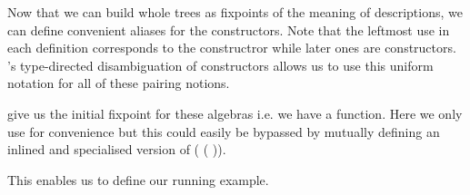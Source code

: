 Now that we can build whole trees as fixpoints of the
meaning of descriptions, we can define convenient aliases for
the  constructors.
%
Note that the leftmost \IdrisData{(\#)} use in each definition corresponds
to the  constructror while later ones are 
constructors.
%
\idris{}'s type-directed disambiguation of constructors allows us to use
this uniform notation for all of these pairing notions.



 give us the initial fixpoint for these algebras i.e.
we have a  function. Here we only use \assertTotal{}
for convenience but this could easily be bypassed by mutually defining
an inlined and specialised version of
( ( )).


This enables us to define our running example.

